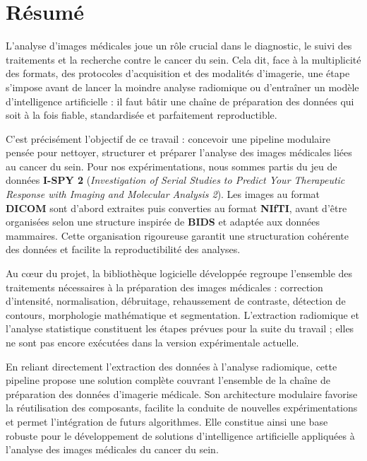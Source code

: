 \documentclass[12pt,a4paper]{report}
\begin{document}
	\newpage
	\section*{Résumé}

L’analyse d’images médicales joue un rôle crucial dans le diagnostic, le suivi des traitements et la recherche contre le cancer du sein. Cela dit, face à la multiplicité des formats, des protocoles d'acquisition et des modalités d'imagerie, une étape s'impose avant de lancer la moindre analyse radiomique ou d'entraîner un modèle d'intelligence artificielle : il faut bâtir une chaîne de préparation des données qui soit à la fois fiable, standardisée et parfaitement reproductible.

C’est précisément l'objectif de ce travail : concevoir une pipeline modulaire pensée pour nettoyer, structurer et préparer l'analyse des images médicales liées au cancer du sein. Pour nos expérimentations, nous sommes partis du jeu de données \textbf{I-SPY 2} (\textit{Investigation of Serial Studies to Predict Your Therapeutic Response with Imaging and Molecular Analysis 2}). Les images au format \textbf{DICOM} sont d'abord extraites puis converties au format \textbf{NIfTI}, avant d'être organisées selon une structure inspirée de \textbf{BIDS} et adaptée aux données mammaires. Cette organisation rigoureuse garantit une structuration cohérente des données et facilite la reproductibilité des analyses.

Au cœur du projet, la bibliothèque logicielle développée regroupe l'ensemble des traitements nécessaires à la préparation des images médicales : correction d'intensité, normalisation, débruitage, rehaussement de contraste, détection de contours, morphologie mathématique et segmentation. L'extraction radiomique et l'analyse statistique constituent les étapes prévues pour la suite du travail ; elles ne sont pas encore exécutées dans la version expérimentale actuelle.

En reliant directement l'extraction des données à l'analyse radiomique, cette pipeline propose une solution complète couvrant l'ensemble de la chaîne de préparation des données d'imagerie médicale. Son architecture modulaire favorise la réutilisation des composants, facilite la conduite de nouvelles expérimentations et permet l'intégration de futurs algorithmes. Elle constitue ainsi une base robuste pour le développement de solutions d'intelligence artificielle appliquées à l'analyse des images médicales du cancer du sein.
\end{document}
